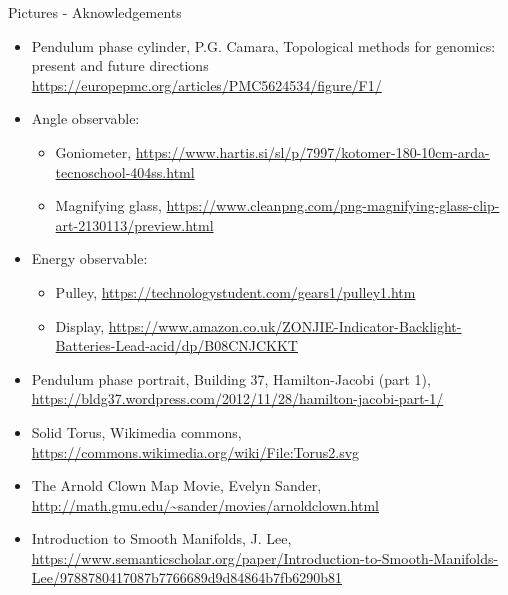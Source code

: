 \documentclass[beamer,10pt]{standalone}
\begin{document}
\begin{frame}[t,allowframebreaks]{Pictures - Aknowledgements}
\begin{itemize}
		\item Pendulum phase cylinder, P.G. Camara, Topological methods for genomics: present and future directions
			\url{https://europepmc.org/articles/PMC5624534/figure/F1/}
		
		\item Angle observable:
			\begin{itemize}
				\item Goniometer,
					\url{https://www.hartis.si/sl/p/7997/kotomer-180-10cm-arda-tecnoschool-404ss.html}
				\item Magnifying glass,
					\url{https://www.cleanpng.com/png-magnifying-glass-clip-art-2130113/preview.html}
			\end{itemize}					
		\item Energy observable:
			\begin{itemize}
				\item Pulley,
					\url{https://technologystudent.com/gears1/pulley1.htm}
				\item Display,
					\url{https://www.amazon.co.uk/ZONJIE-Indicator-Backlight-Batteries-Lead-acid/dp/B08CNJCKKT}
			\end{itemize}
		\item Pendulum phase portrait, Building 37, Hamilton-Jacobi (part 1),
			\url{https://bldg37.wordpress.com/2012/11/28/hamilton-jacobi-part-1/}
			
		\item Solid Torus, Wikimedia commons,
			\url{https://commons.wikimedia.org/wiki/File:Torus2.svg}
		\item The Arnold Clown Map Movie, Evelyn Sander,
			\url{http://math.gmu.edu/~sander/movies/arnoldclown.html}
			
		\item Introduction to Smooth Manifolds, J. Lee,
			\url{https://www.semanticscholar.org/paper/Introduction-to-Smooth-Manifolds-Lee/9788780417087b7766689d9d84864b7fb6290b81}			
			
	\end{itemize}
\end{frame}
\note[itemize]{
	\item
}



\end{document}
